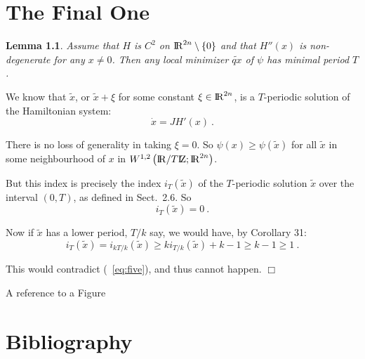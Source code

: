 \documentclass[abstracton,12pt]{scrreprt}
\newtheorem{lemma}{Lemma}
\newenvironment{proof}
  {\noindent{\bf Proof:\rm}}{\hfill$\Box$\vspace{\medskipamount}}
\def\bbbr{{\rm I\!R}}
\def\bbbz{{\rm I\!Z}}
\begin{document}
\chapter{The Final One}

\begin{lemma}
Assume that $H$ is $C^{2}$ on $\bbbr^{2n} \setminus \{ 0\}$ and
that $H'' (x)$ is non-de\-gen\-er\-ate for any $x\ne 0$. Then any local
minimizer $\widetilde{qx}$ of $\psi$ has minimal period $T$.
\end{lemma}

\begin{proof}
We know that $\widetilde{x}$, or
$\widetilde{x} + \xi$ for some constant $\xi
\in \bbbr^{2n}$, is a $T$-periodic solution of the Hamiltonian system:
\begin{equation}
  \dot{x} = JH' (x)\ .
\end{equation}

There is no loss of generality in taking $\xi = 0$. So
$\psi (x) \ge \psi (\widetilde{x} )$
for all $\widetilde{x}$ in some neighbourhood of $x$ in
$W^{1,2} \left(\bbbr / T\bbbz ; \bbbr^{2n}\right)$.

But this index is precisely the index
$i_{T} (\widetilde{x} )$ of the $T$-periodic
solution $\widetilde{x}$ over the interval
$(0,T)$, as defined in Sect.~2.6. So
\begin{equation}
  i_{T} (\widetilde{x} ) = 0\ .
  \label{eq:five}
\end{equation}

Now if $\widetilde{x}$ has a lower period, $T/k$ say,
we would have, by Corollary 31:
\begin{equation}
  i_{T} (\widetilde{x} ) =
  i_{kT/k}(\widetilde{x} ) \ge
  ki_{T/k} (\widetilde{x} ) + k-1 \ge k-1 \ge 1\ .
\end{equation}

This would contradict (~\ref{eq:five}), and thus cannot happen.
\end{proof}

\begin{figure}[htbp]\centering

\end{figure}

A reference to a Figure~

\chapter*{Bibliography}



\end{document}
